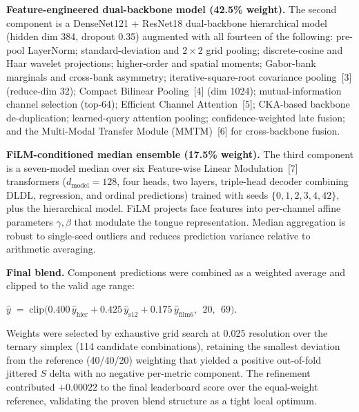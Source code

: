 \documentclass[9pt,letterpaper]{extarticle}
\newcommand{\codebox}[1]{%
  \begin{center}
  \colorbox{codebg}{\parbox{0.92\linewidth}{\centering\small #1}}
  \end{center}}
\begin{document}
\textbf{Feature-engineered dual-backbone model (42.5\% weight).}
The second component is a DenseNet121 + ResNet18 dual-backbone hierarchical
model (hidden dim 384, dropout 0.35) augmented with all fourteen of the
following: pre-pool LayerNorm; standard-deviation and $2\!\times\!2$ grid
pooling; discrete-cosine and Haar wavelet projections; higher-order and spatial
moments; Gabor-bank marginals and cross-bank asymmetry; iterative-square-root
covariance pooling~[3] (reduce-dim 32); Compact Bilinear
Pooling~[4] (dim 1024); mutual-information channel selection
(top-64); Efficient Channel Attention~[5]; CKA-based backbone
de-duplication; learned-query attention pooling; confidence-weighted late fusion;
and the Multi-Modal Transfer Module (MMTM)~[6] for cross-backbone
fusion.

\textbf{FiLM-conditioned median ensemble (17.5\% weight).}
The third component is a seven-model median over six Feature-wise Linear
Modulation~[7] transformers
($d_{\text{model}}\!=\!128$, four heads, two layers, triple-head decoder
combining DLDL, regression, and ordinal predictions) trained with seeds
$\{0,1,2,3,4,42\}$, plus the hierarchical model. FiLM projects face features
into per-channel affine parameters $\gamma,\beta$ that modulate the tongue
representation. Median aggregation is robust to single-seed outliers and reduces
prediction variance relative to arithmetic averaging.

\textbf{Final blend.}
Component predictions were combined as a weighted average and clipped to the
valid age range:
\codebox{$\displaystyle \hat{y}\;=\;\mathrm{clip}\bigl(0.400\,\hat{y}_{\text{hier}}
+ 0.425\,\hat{y}_{\text{s12}} + 0.175\,\hat{y}_{\text{film6}},\;\,20,\;\,69\bigr).$}
Weights were selected by exhaustive grid search at 0.025 resolution over the
ternary simplex (114 candidate combinations), retaining the smallest deviation
from the reference (40/40/20) weighting that yielded a positive out-of-fold
jittered $S$ delta with no negative per-metric component. The refinement
contributed $+0.00022$ to the final leaderboard score over the equal-weight
reference, validating the proven blend structure as a tight local optimum.

\end{document}
